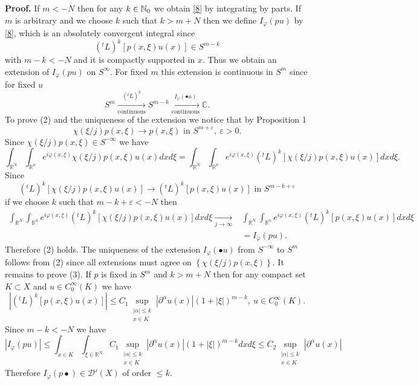 \documentclass[12pt,reqno]{amsart}
\newcommand{\rr}{\mathbb{R}}
\newcommand{\cc}{\mathbb{C}}
\theoremstyle{plain}  %
\theoremstyle{definition}
\newcommand{\ve}{\varepsilon}
\newcommand{\nin}{\noindent}
\newcommand{\vph}{\varphi}
\begin{document}
\vskip0.1in
\nin
{\bf Proof.}  If $m<-N$ then for any $k \in \Bbb N_0$ we obtain \eqref{8} by
integrating by parts.  If $m$ is arbitrary and we choose $k$ such that $k > m + N$ 
then we define $ I_\vph (pu) $ by \eqref{8}, which is an absolutely convergent integral
since $$({}^tL)^k [p(x,\xi) u (x)] \in S^{m-k}$$
with $m - k < -N$ and it is compactly supported in $x$.  Thus we obtain an 
extension  of $I_\vph(pu)$ on $S^\infty$.  For fixed $m$ this extension is
continuous in $S^m$ since for fixed $u$
$$ S^m
\xrightarrow[\text{continuous}]{(^tL)^k}
S^{m-k} \xrightarrow[\text{continuous}]{I_\vph (\bullet u)}\cc.$$
To prove (2) and the uniqueness of the extension we notice that by Proposition 
1 $$\chi (\xi/j)p(x,\xi) \longrightarrow p(x,\xi) \text{ in }
S^{m+\ve}, \ \ve > 0.$$  
Since $ \chi (\xi/j) p(x,\xi) \in S^{-\infty}$ we have
$$\int_{\rr^N } \int_{\rr^n} e^{i\vph(x,\xi)} \chi  (\xi/j )p(x,\xi) u(x)dx
d\xi = \int_{\rr^N} \int_{\rr^n}  e^{i\vph(x,\xi)}  ({}^tL)^k[ \chi (\xi/ j) p
(x,\xi) u (x)] dx d\xi .$$  Since
$$({}^tL)^k \left [\chi (\xi/ j) p(x,\xi) u (x)\right ] \longrightarrow
({}^tL)^k[p(x,\xi)u(x)] \text{ in } S^{m-k+\ve}$$
\vskip0.1in
\nin
if we choose $ k $  such that  $m-k+\ve < -N$ then
\begin{equation*}
	\begin{split}
\int_{\rr^N} \int_{\rr^n}  e^{i\vph(x,\xi)} ({}^tL)^k [ \chi (\xi/j)p(x,\xi) u
(x)] dx d\xi \xrightarrow[j\to \infty]{} &\int_{\rr^N} \int_{\rr^n}  e^{i\vph (x,\xi)}
({}^tL)^k [p (x,\xi) u (x)]dx d\xi \\
 &= I_\vph (pu).
\end{split}
\end{equation*}
Therefore (2) holds.
The uniqueness of the extension $I_\vph(\bullet u)$ from $S^{-\infty}$ to
$S^m$  follows from (2) since all extensions must agree on 
$\left \{\chi (\xi /j) p(x,\xi)\right \}$.
It remains to prove (3).  If $p$ is fixed in $S^m$ and $k>m+N$ then for any 
compact set $ K\subset X$ and $u\in C_0^\infty(K)$  we have
$$|({}^tL)^k[p(x,\xi) u (x)]|\le C_1 \sup_{\substack{ |\alpha| \le k \\ x
\in K}} |\partial^\alpha u(x)|(1+|\xi|)^{m-k},\  u \in C^\infty_0(K).$$
Since $m - k < -N$ we have
$$|I_\vph(pu)| \le \int_{x \in K} \int_{\xi \in \rr^N} C_1
\sup_{\substack{|\alpha| \le k \\ x \in K}} |\partial^\alpha u (x)|(1+|\xi|)^{m-k} dx d\xi
\le C_2 \sup_{\substack{|\alpha| \le k\\x \in K}}  |\partial^\alpha u(x)|$$
Therefore $I_\vph(p \bullet) \in  \mathcal{D'}(X)$ of order $\le k$.
\end{document}

